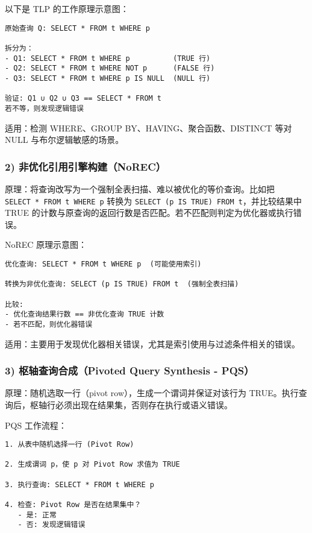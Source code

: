 \documentclass[
]{article}
\begin{document}
以下是 TLP 的工作原理示意图：

\begin{verbatim}
原始查询 Q: SELECT * FROM t WHERE p

拆分为：
- Q1: SELECT * FROM t WHERE p          (TRUE 行)
- Q2: SELECT * FROM t WHERE NOT p      (FALSE 行)
- Q3: SELECT * FROM t WHERE p IS NULL  (NULL 行)

验证: Q1 ∪ Q2 ∪ Q3 == SELECT * FROM t
若不等，则发现逻辑错误
\end{verbatim}

适用：检测 WHERE、GROUP BY、HAVING、聚合函数、DISTINCT 等对 NULL
与布尔逻辑敏感的场景。

\subsubsection{2)
非优化引用引擎构建（NoREC）}\label{ux975eux4f18ux5316ux5f15ux7528ux5f15ux64ceux6784ux5efanorec}

原理：将查询改写为一个强制全表扫描、难以被优化的等价查询。比如把
\texttt{SELECT\ *\ FROM\ t\ WHERE\ p} 转换为
\texttt{SELECT\ (p\ IS\ TRUE)\ FROM\ t}，并比较结果中 TRUE
的计数与原查询的返回行数是否匹配。若不匹配则判定为优化器或执行错误。

NoREC 原理示意图：

\begin{verbatim}
优化查询: SELECT * FROM t WHERE p  (可能使用索引)

转换为非优化查询: SELECT (p IS TRUE) FROM t  (强制全表扫描)

比较:
- 优化查询结果行数 == 非优化查询 TRUE 计数
- 若不匹配，则优化器错误
\end{verbatim}

适用：主要用于发现优化器相关错误，尤其是索引使用与过滤条件相关的错误。

\subsubsection{3) 枢轴查询合成（Pivoted Query Synthesis -
PQS）}\label{ux67a2ux8f74ux67e5ux8be2ux5408ux6210pivoted-query-synthesis---pqs}

原理：随机选取一行（pivot row），生成一个谓词并保证对该行为
TRUE。执行查询后，枢轴行必须出现在结果集，否则存在执行或语义错误。

PQS 工作流程：

\begin{verbatim}
1. 从表中随机选择一行 (Pivot Row)

2. 生成谓词 p，使 p 对 Pivot Row 求值为 TRUE

3. 执行查询: SELECT * FROM t WHERE p

4. 检查: Pivot Row 是否在结果集中？
   - 是: 正常
   - 否: 发现逻辑错误
\end{verbatim}
\end{document}
